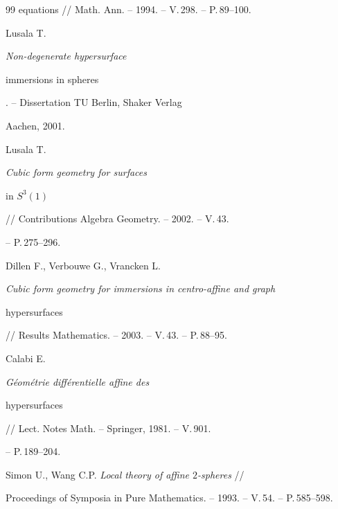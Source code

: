 \begin{thebibliography}{99}
{equations} // Math. Ann. -- 1994. -- V.\,298. -- P.\,89--100.




Lusala T. {\it Non-degenerate hypersurface

immersions in spheres}. -- Dissertation TU Berlin, Shaker Verlag

Aachen, 2001.




Lusala T. {\it Cubic form geometry for surfaces

in $S^3(1)$} // Contributions Algebra Geometry. -- 2002. -- V.\,43.

-- P.\,275--296.




Dillen F., Verbouwe G., Vrancken L.

{\it Cubic form geometry for immersions in centro-affine and graph

hypersurfaces} // Results Mathematics. -- 2003. -- V.\,43. -- P.\,88--95.




Calabi E. {\it G\'{e}om\'{e}trie diff\'{e}rentielle affine des

hypersurfaces} // Lect. Notes Math. -- Springer, 1981. -- V.\,901.

-- P.\,189--204.




Simon U., Wang C.P. {\it Local theory of affine $2$-spheres} //

Proceedings of Symposia in Pure Mathematics. -- 1993. -- V.\,54. -- P.\,585--598.





\end{thebibliography}










